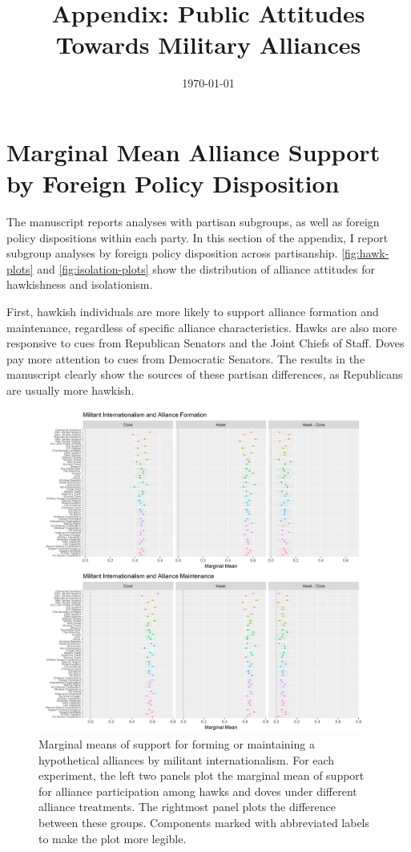 \documentclass[12pt]{article}
\title{\textbf{Appendix: Public Attitudes Towards Military Alliances}}
\author{}
\date{\today}
\begin{document}
\maketitle 

\doublespace 


\section{Marginal Mean Alliance Support by Foreign Policy Disposition} 


The manuscript reports analyses with partisan subgroups, as well as foreign policy dispositions within each party. 
In this section of the appendix, I report subgroup analyses by foreign policy disposition across partisanship. 
\autoref{fig:hawk-plots} and \autoref{fig:isolation-plots} show the distribution of alliance attitudes for hawkishness and isolationism. 


First, hawkish individuals are more likely to support alliance formation and maintenance, regardless of specific alliance characteristics. 
Hawks are also more responsive to cues from Republican Senators and the Joint Chiefs of Staff. 
Doves pay more attention to cues from Democratic Senators.
The results in the manuscript clearly show the sources of these partisan differences, as Republicans are usually more hawkish. 


\begin{figure}
	\centering
		\includegraphics[width=0.95\textwidth]{hawk-plots.png}
	\caption{Marginal means of support for forming or maintaining a hypothetical alliances by militant internationalism. For each experiment, the left two panels plot the marginal mean of support for alliance participation among hawks and doves under different alliance treatments. The rightmost panel plots the difference between these groups. Components marked with abbreviated labels to make the plot more legible.}
	\label{fig:hawk-plots}
\end{figure}
\end{document}
